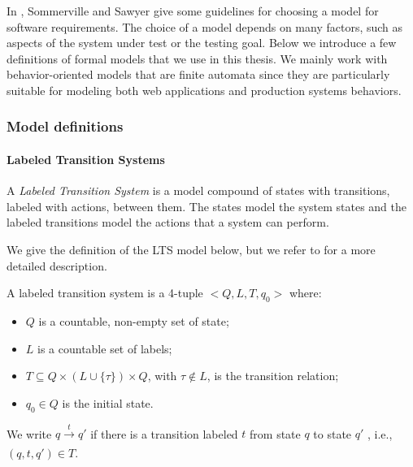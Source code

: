 In \cite{Sommerville:1997:REG:549198}, Sommerville and Sawyer
give some guidelines for choosing a model for software
requirements. The choice of a model depends on many factors, such
as aspects of the system under test or the testing goal.  Below
we introduce a few definitions of formal models that we use in
this thesis. We mainly work with behavior-oriented models that
are finite automata since they are particularly suitable for
modeling both web applications and production systems behaviors.

\subsubsection{Model definitions}

\paragraph{Labeled Transition Systems}
\label{sec:definitions:lts}

A \textit{Labeled Transition System} is a model compound of
states with transitions, labeled with actions, between them.
The states model the system states and the labeled transitions
model the actions that a system can perform.

We give the definition of the LTS model below, but we refer to
\cite{ltsTretmans} for a more detailed description.

\begin{definition}
    A labeled transition system is a 4-tuple $<Q,L,T,q_0>$ where:

    \begin{itemize}
    \item $Q$ is a countable, non-empty set of state;

    \item $L$ is a countable set of labels;

    \item $T \subseteq Q \times (L \cup \{\tau\}) \times Q$, with
    $\tau \not\in L$, is the transition relation;

    \item $q_0 \in Q$ is the initial state.

    \end{itemize}

    We write $q \xrightarrow[]{t} q'$ if there is a transition
    labeled $t$ from state $q$ to state $q'$ , i.e., $(q, t, q')
    \in T$.

	\label{def:lts}
\end{definition}


